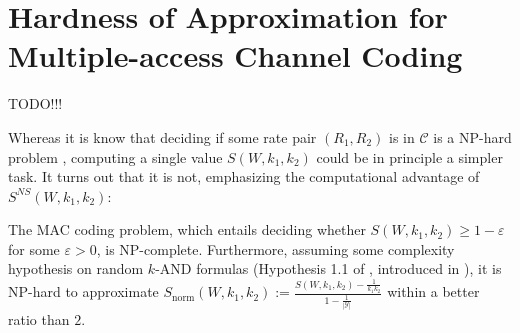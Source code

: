 \section{Hardness of Approximation for Multiple-access Channel Coding}
TODO!!!

Whereas it is know that deciding if some rate pair $(R_1,R_2)$ is in $\mathcal{C}$ is a \textrm{NP}-hard problem \cite{LALS20}, computing a single value $S(W,k_1,k_2)$ could be in principle a simpler task. It turns out that it is not, emphasizing the computational advantage of $S^{NS}(W,k_1,k_2)$:

\begin{proposition}
  \label{prop:hardnessMAC} 
  The MAC coding problem, which entails deciding whether $S(W,k_1,k_2) \geq 1-\varepsilon$ for some $\varepsilon > 0$, is \textrm{NP}-complete.
   Furthermore, assuming some complexity hypothesis on random $k$-AND formulas (Hypothesis 1.1 of \cite{AAMMW11}, introduced in \cite{Feige02}), it is \textrm{NP}-hard to approximate $S_{\text{norm}}(W,k_1,k_2) := \frac{S(W,k_1,k_2)-\frac{1}{k_1k_2}}{1-\frac{1}{|\mathcal{Y}|}}$ within a better ratio than $2$.
\end{proposition}

